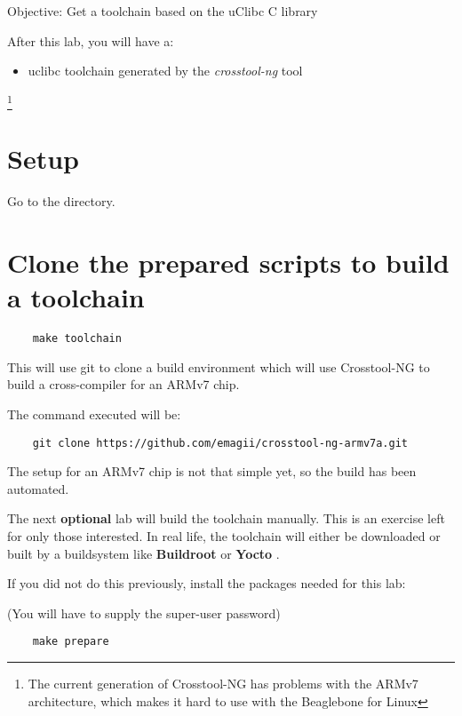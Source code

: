{Objective: Get a toolchain based on the uClibc C library}

After this lab, you will have a:

\begin{itemize}
\item uclibc toolchain generated by the {\em crosstool-ng} tool
\end{itemize}

\footnote{The current generation of Crosstool-NG has problems with the ARMv7 architecture, 
which makes it hard to use with the Beaglebone for Linux}

\section{Setup}

Go to the \labdir directory.

\section{Clone the prepared scripts to build a toolchain}

\begin{verbatim}
	make toolchain
\end{verbatim}

This will use git to clone a build environment which will use 
Crosstool-NG to build a cross-compiler for an ARMv7 chip.

The command executed will be:

\begin{verbatim}
	git clone https://github.com/emagii/crosstool-ng-armv7a.git
\end{verbatim}


The setup for an ARMv7 chip is not that simple yet,
so the build has been automated. 

The next {\bf optional } lab will build the toolchain manually. 
This is an exercise left for only those interested. 
In real life, the toolchain will either be downloaded or built by a
buildsystem like {\bf Buildroot } or {\bf Yocto }.

If you did not do this previously, install the packages needed for this lab:

(You will have to supply the super-user password)

\begin{verbatim}
	make prepare
\end{verbatim}

